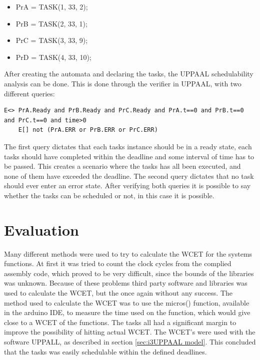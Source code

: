 \begin{itemize}
	\item PrA = TASK(1, 33, 2);
	\item PrB = TASK(2, 33, 1);
	\item PrC = TASK(3, 33, 9);
	\item PrD = TASK(4, 33, 10);
\end{itemize}

After creating the automata and declaring the tasks, the UPPAAL schedulability analysis can be done. This is done through the verifier in UPPAAL, with two different queries:

\begin{lstlisting}[caption={Queries for UPPAAL}, label={QueriesAppendix}]
	E<> PrA.Ready and PrB.Ready and PrC.Ready and PrA.t==0 and PrB.t==0 and PrC.t==0 and time>0
	E[] not (PrA.ERR or PrB.ERR or PrC.ERR)
\end{lstlisting}

The first query dictates that each tasks instance should be in a ready state, each tasks should have completed within the deadline and some interval of time has to be passed. This creates a scenario where the tasks has all been executed, and none of them have exceeded the deadline.
The second query dictates that no task should ever enter an error state.
After verifying both queries it is possible to say whether the tasks can be scheduled or not, in this case it is possible.

\section{Evaluation}
\label{sec:i3Evaluation}
Many different methods were used to try to calculate the WCET for the systems functions. At first it was tried to count the clock cycles from the complied assembly code, which proved to be very difficult, since the bounds of the libraries was unknown. Because of these problems third party software and libraries was used to calculate the WCET, but the once again without any success. The method used to calculate the WCET was to use the micros() function, available in the arduino IDE, to measure the time used on the function, which would give close to a WCET of the functions. The tasks all had a significant margin to improve the possibility of hitting actual WCET. \newline
The WCET's were used with the software UPPALL, as described in section \ref{sec:i3UPPAAL model}. This concluded that the tasks was easily schedulable within the defined deadlines.

